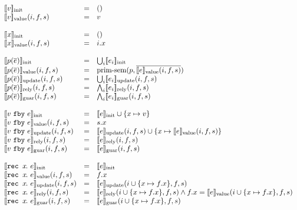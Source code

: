 \begin{figure}
  \[
  \begin{array}{lrl}
    \sysinit{v} & = & () \\
    \sysvalue{v}(i, f, s) & = & v \\
    \\
    \sysinit{x} & = & () \\
    \sysvalue{x}(i, f, s) & = & i.x \\
    \\
    \sysinit{p(\ov{e})} & = & \bigcup_i \sysinit{e_i} \\
    \sysvalue{p(\ov{e})}(i, f, s) & = & \text{prim-sem}(p, \ov{\sysvalue{e}(i, f, s)}) \\
    \sysupdate{p(\ov{e})}(i, f, s) & = & \bigcup_i \sysupdate{e_i}(i, f, s) \\
    \sysrely{p(\ov{e})}(i, f, s) & = & \bigwedge_i \sysrely{e_i}(i, f, s) \\
    \sysguar{p(\ov{e})}(i, f, s) & = & \bigwedge_i \sysguar{e_i}(i, f, s) \\
    \\
    \sysinit{\xfby{v}{e}} & = & \sysinit{e} \cup \{ x \mapsto v \} \\
    \sysvalue{\xfby{v}{e}}(i, f, s) & = & s.x \\
    \sysupdate{\xfby{v}{e}}(i, f, s) & = & \sysupdate{e}(i, f, s) \cup \{x \mapsto \sysvalue{e}(i, f, s)\}\\
    \sysrely{\xfby{v}{e}}(i, f, s) & = & \sysrely{e}(i, f, s) \\
    \sysguar{\xfby{v}{e}}(i, f, s) & = & \sysguar{e}(i, f, s) \\
    \\
    \sysinit{\xrec{x}{e}} & = & \sysinit{e} \\
    \sysvalue{\xrec{x}{e}}(i, f, s) & = & f.x \\
    \sysupdate{\xrec{x}{e}}(i, f, s) & = & \sysupdate{e}(i \cup \{ x \mapsto f.x \}, f, s)\\
    \sysrely{\xrec{x}{e}}(i, f, s) & = & \sysrely{e}(i \cup \{ x \mapsto f.x \}, f, s) \wedge f.x = \sysvalue{e}(i \cup \{ x \mapsto f.x \}, f, s) \\
    \sysguar{\xrec{x}{e}}(i, f, s) & = & \sysguar{e}(i \cup \{ x \mapsto f.x \}, f, s) \\

\end{array}\]
\end{figure}
